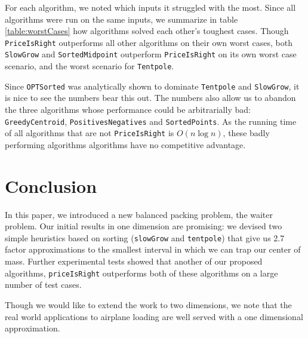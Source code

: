 \documentclass[11pt,twocolumn]{article}
\begin{document}
For each algorithm, we noted which inputs it struggled with the most.  Since all algorithms were run on the same inputs, we summarize in table \ref{table:worstCases} how algorithms solved each other's toughest cases.  Though \texttt{PriceIsRight} outperforms all other algorithms on their own worst cases, both \texttt{SlowGrow} and \texttt{SortedMidpoint} outperform \texttt{PriceIsRight} on its own worst case scenario, and the worst scenario for \texttt{Tentpole}.

Since \texttt{OPTSorted} was analytically shown to dominate \texttt{Tentpole} and \texttt{SlowGrow}, it is nice to see the numbers bear this out.  The numbers also allow us to abandon the three algorithms whose performance could be arbitrarially bad: \texttt{GreedyCentroid}, \texttt{PositivesNegatives} and \texttt{SortedPoints}.  As the running time of all algorithms that are not \texttt{PriceIsRight} is $O(n \log n)$, these badly performing algorithms algorithms have no competitive advantage.


\section{Conclusion}

In this paper, we introduced a new balanced packing problem, the waiter problem.  Our initial results in one dimension are promising: we devised two simple heuristics based on sorting (\texttt{slowGrow} and \texttt{tentpole}) that give us 2.7 factor approximations to the smallest interval in which we can trap our center of mass.  Further experimental tests showed that another of our proposed algorithms, \texttt{priceIsRight} outperforms both of these algorithms on a large number of test cases.

Though we would like to extend the work to two dimensions, we note that the real world applications to airplane loading are well served with a one dimensional approximation.  


{}
\end{document}
